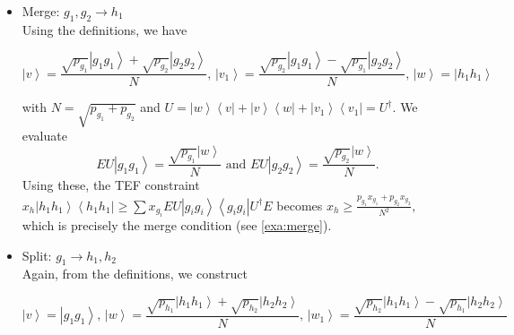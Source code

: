 \documentclass{theoretics}
\begin{document}
\begin{itemize}
  \item Merge: $g_{1},g_{2}\to h_{1}$\\
        Using the definitions, we have
        \begin{small}
          \begin{displaymath}
            \left|v\right\rangle =\frac{\sqrt{p_{g_{1}}}\left|g_{1}g_{1}\right\rangle +\sqrt{p_{g_{2}}}\left|g_{2}g_{2}\right\rangle }{N},\,\left|v_{1}\right\rangle =\frac{\sqrt{p_{g_{2}}}\left|g_{1}g_{1}\right\rangle -\sqrt{p_{g_{1}}}\left|g_{2}g_{2}\right\rangle }{N},\,\left|w\right\rangle =\left|h_{1}h_{1}\right\rangle
          \end{displaymath}
        \end{small}

        with $N=\sqrt{p_{g_{1}}+p_{g_{2}}}$ and
        $
          U=\left|w\right\rangle \left\langle v\right|+\left|v\right\rangle \left\langle w\right|+\left|v_{1}\right\rangle \left\langle v_{1}\right|=U^\dagger.
        $
        We evaluate
        \begin{displaymath}
          EU\left|g_{1}g_{1}\right\rangle =\frac{\sqrt{p_{g_{1}}}\left|w\right\rangle }{N} \text{ and } EU\left|g_{2}g_{2}\right\rangle =\frac{\sqrt{p_{g_{2}}}\left|w\right\rangle }{N}.
        \end{displaymath}
        Using these, the TEF constraint
        $
          x_{h}\left|h_{1}h_{1}\right\rangle \left\langle h_{1}h_{1}\right|\ge\sum x_{g_{i}}EU\left|g_{i}g_{i}\right\rangle \left\langle g_{i}g_{i}\right|U^{\dagger}E
        $ becomes
        $
          x_{h}\ge\frac{p_{g_{1}}x_{g_{1}}+p_{g_{2}}x_{g_{2}}}{N^{2}},
        $
        which is precisely the merge condition (see \cref{exa:merge}).

  \item Split: $g_{1}\to h_{1},h_{2}$\\
        Again, from the definitions, we construct
        \begin{small}
          \begin{displaymath}
            \left|v\right\rangle =\left|g_{1}g_{1}\right\rangle ,\,\left|w\right\rangle =\frac{\sqrt{p_{h_{1}}}\left|h_{1}h_{1}\right\rangle +\sqrt{p_{h_{2}}}\left|h_{2}h_{2}\right\rangle }{N},\,\left|w_{1}\right\rangle =\frac{\sqrt{p_{h_{2}}}\left|h_{1}h_{1}\right\rangle -\sqrt{p_{h_{1}}}\left|h_{2}h_{2}\right\rangle }{N}
          \end{displaymath}
        \end{small}


\end{itemize}
\end{document}
